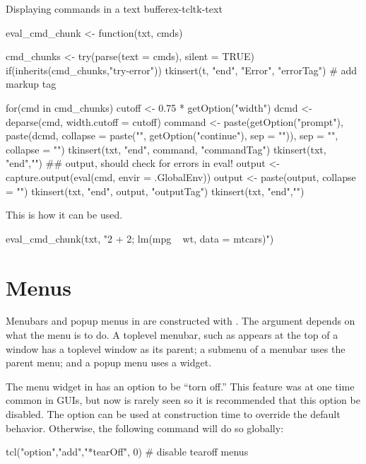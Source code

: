 \begin{example}{Displaying commands in a text buffer}{ex-tcltk-text}
\begin{Schunk}
\begin{Sinput}
 eval_cmd_chunk <- function(txt, cmds) {
   
   cmd_chunks <- try(parse(text = cmds), silent = TRUE)
   if(inherits(cmd_chunks,"try-error")) {
     tkinsert(t, "end", "Error", "errorTag") # add markup tag
   }
 
   for(cmd in cmd_chunks) {
     cutoff <- 0.75 * getOption("width")
     dcmd <- deparse(cmd, width.cutoff = cutoff)
     command <- 
       paste(getOption("prompt"),
             paste(dcmd, collapse = paste("\n", 
                           getOption("continue"), sep = "")),
             sep = "", collapse = "")
     tkinsert(txt, "end", command, "commandTag")
     tkinsert(txt, "end","\n")
     ## output, should check for errors in eval!
     output <- capture.output(eval(cmd, envir = .GlobalEnv))
     output <- paste(output, collapse = "\n")
     tkinsert(txt, "end", output, "outputTag")
     tkinsert(txt, "end","\n")
   }
 }
\end{Sinput}
\end{Schunk}



This is how it can be used.
\begin{Schunk}
\begin{Sinput}
 eval_cmd_chunk(txt, "2 + 2; lm(mpg ~ wt, data = mtcars)")
\end{Sinput}
\end{Schunk}
\end{example}



\section{Menus}
\label{sec:tcltk:menus}

Menubars and popup menus in \Tk\/ are constructed with
. The  argument depends on what the menu is
to do. A toplevel menubar, such as appears at the top of a window has
a toplevel window as its parent; a submenu of a menubar uses the
parent menu; and a popup menu uses a widget.  

The menu widget in \Tk\/ has an option to be ``torn off.'' This
feature was at one time common in GUIs, but now is rarely seen so it
is recommended that this option be disabled. The
 option can be used at construction time to
override the default behavior. Otherwise, the following command will
do so globally:
\begin{Schunk}
\begin{Sinput}
 tcl("option","add","*tearOff", 0)    # disable tearoff menus
\end{Sinput}
\end{Schunk}
%

